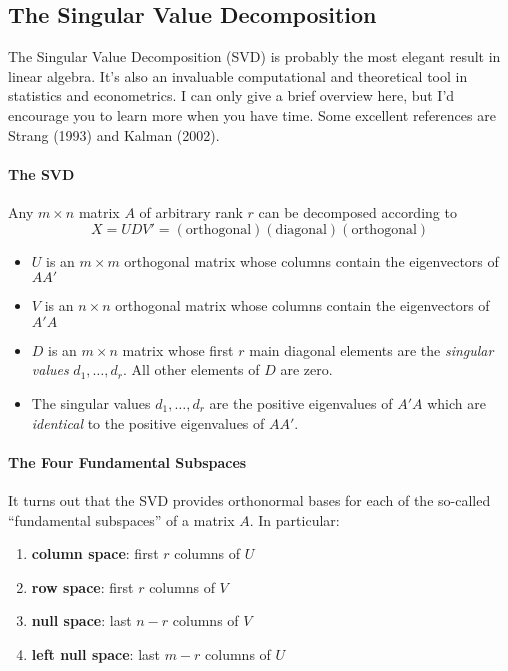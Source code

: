 \subsection{The Singular Value Decomposition}
The Singular Value Decomposition (SVD) is probably the most elegant result in linear algebra. It's also an invaluable computational and theoretical tool in statistics and econometrics. I can only give a brief overview here, but I'd encourage you to learn more when you have time. Some excellent references are Strang (1993) and Kalman (2002).

\paragraph{The SVD} Any $m \times n$ matrix $A$ of arbitrary rank $r$ can be decomposed according to 
	$$X = UDV' = (\mbox{orthogonal})(\mbox{diagonal})(\mbox{orthogonal})$$
	\begin{itemize}
	 	\item $U$ is an $m\times m$ orthogonal matrix whose columns contain the eigenvectors of $AA'$
	 	\item $V$ is an $n\times n$ orthogonal matrix whose columns contain the eigenvectors of $A'A$
	 	\item $D$ is an $m\times n$ matrix whose first $r$ main diagonal elements are the  \emph{singular values} $d_1, \hdots, d_r$. All other elements of $D$ are zero.
	 	\item The singular values $d_1, \hdots, d_r$ are the positive eigenvalues of $A'A$ which are \emph{identical} to the positive eigenvalues of $AA'$.
	 \end{itemize} 

\paragraph{The Four Fundamental Subspaces} It turns out that the SVD provides orthonormal bases for each of the so-called ``fundamental subspaces'' of a matrix $A$. In particular:
	\begin{enumerate}
		\item \textbf{column space}: first $r$ columns of $U$
		\item \textbf{row space}: first $r$ columns of $V$
		\item \textbf{null space}: last $n - r$ columns of $V$
		\item \textbf{left null space}: last $m - r$ columns of $U$
	\end{enumerate}

